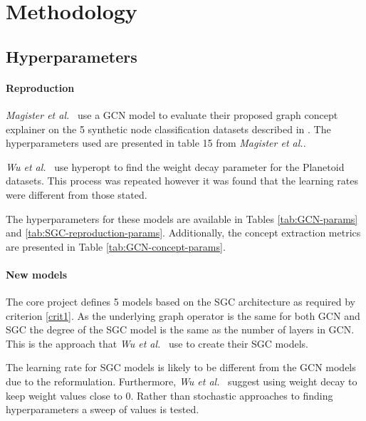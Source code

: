 \section{Methodology}

\subsection{Hyperparameters}
\label{sec:hyperparameters}

\paragraph{Reproduction}
\textit{Magister et al.}~\cite{magister2021gcexplainer} use a GCN model to evaluate their proposed graph concept explainer on the 5 synthetic node classification datasets described in .
The hyperparameters used are presented in table 15 from \textit{Magister et al.}. 

\textit{Wu et al.}~\cite{wu2019simplifying} use hyperopt to find the weight decay parameter for the Planetoid~\cite{kipf2016semi} datasets.
This process was repeated however it was found that the learning rates were different from those stated.

The hyperparameters for these models are available in Tables \ref{tab:GCN-params} and \ref{tab:SGC-reproduction-params}.
Additionally, the concept extraction metrics are presented in Table \ref{tab:GCN-concept-params}.

%
%
%

\paragraph{New models}
The core project defines 5 models based on the SGC architecture as required by criterion \ref{crit1}.
As the underlying graph operator is the same for both GCN and SGC the degree of the SGC model is the same as the number of layers in GCN.
This is the approach that \textit{Wu et al.}~\cite{wu2019simplifying} use to create their SGC models.

The learning rate for SGC models is likely to be different from the GCN models due to the reformulation.
Furthermore, \textit{Wu et al.}~\cite{wu2019simplifying} suggest using weight decay to keep weight values close to $0$.
Rather than stochastic approaches to finding hyperparameters a sweep of values is tested.

